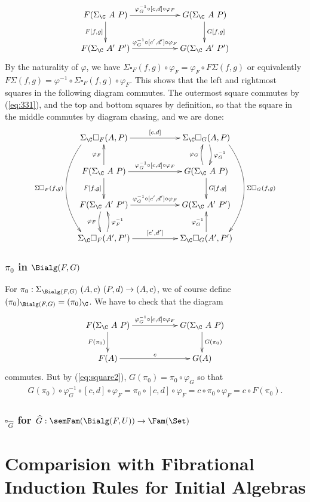 \documentclass{article}
\begin{document}
\[
\xymatrix{
F(\Sigma_{\C}\ A\ P) \ar^-{\varphi^{-1}_G \circ [c, d] \circ \varphi_F}[rr] \ar_-{F[f, g]}[d] & & G(\Sigma_{\C}\ A\ P) \ar^-{G[f,g]}[d] \\
F(\Sigma_{\C}\ A'\ P') \ar^-{\varphi^{-1}_G \circ [c', d'] \circ \varphi_F}[rr] & & G(\Sigma_{\C}\ A'\ P')
}
\]
By the naturality of $\varphi$, we have $\Sigma\square_F(f, g) \circ
\varphi_F = \varphi_F \circ F\Sigma(f, g)$ or equivalently $F\Sigma(f,
g) = \varphi^{-1} \circ \Sigma\square_F(f, g) \circ \varphi_F$. This
shows that the left and rightmost squares in the following diagram
commutes. The outermost square commutes by (\ref{eq:331}), and the top
and bottom squares by definition, so that the square in the middle
commutes by diagram chasing, and we are done:
\[
\xymatrix{
\Sigma_{\C}\square_F(A,P) \ar^-{[c, d]}[rr]  \ar_-{\Sigma\square_F(f, g)}@<-5ex>@/_2pc/[ddd] & & \Sigma_{\C}\square_G(A,P) \ar^-{\varphi^{-1}_G}@/^/[d] \ar^-{\Sigma\square_G(f, g)}@<5ex>@/^2pc/[ddd] \\
F(\Sigma_{\C}\ A\ P) \ar^-{\varphi_F}[u] \ar^-{\varphi^{-1}_G \circ [c, d] \circ \varphi_F}[rr] \ar_-{F[f, g]}[d] & & G(\Sigma_{\C}\ A\ P) \ar^-{G[f,g]}[d] \ar^-{\varphi_G}@/^/[u] \\
F(\Sigma_{\C}\ A'\ P') \ar_-{\varphi_F}@/_/[d] \ar^-{\varphi^{-1}_G \circ [c', d'] \circ \varphi_F}[rr] & & G(\Sigma_{\C}\ A'\ P') \\
\Sigma_{\C}\square_F(A',P') \ar_-{\varphi^{-1}_F}@/_/[u] \ar^-{[c', d']}[rr]  & & \Sigma_{\C}\square_G(A',P') \ar^-{\varphi^{-1}_G}[u] 
}
\]

\subsubsection{$\pi_0$ in $\Bialg(F, G)$}

For $\pi_0 : \Sigma_{\Bialg(F, G)}\ (A, c)\ (P, d) \to (A, c)$, we of course define $(\pi_0)_{\Bialg(F, G)} = (\pi_0)_{\C}$. We have to check that the diagram
\[
\xymatrix{
F(\Sigma_{\C}\ A\ P) \ar^-{\varphi^{-1}_G \circ [c, d] \circ \varphi_F}[rr] \ar_-{F(\pi_0)}[d] & & G(\Sigma_{\C}\ A\ P) \ar^-{G(\pi_0)}[d] \\
F(A) \ar^-{c}[rr] & & G(A)
}
\]
commutes. But by (\ref{eq:square2}), $G(\pi_0) = \pi_0 \circ \varphi_G$ so that
\begin{align*}
  G(\pi_0) \circ \varphi^{-1}_G \circ [c, d] \circ \varphi_F
  = \pi_0 \circ [c, d] \circ \varphi_F %
  = c \circ \pi_0  \circ \varphi_F %
  = c \circ F(\pi_0).
\end{align*}

\subsubsection{$\square_{\widehat{G}}$ for $\widehat{G} : \semFam(\Bialg(F, U)) \to \Fam(\Set)$}



\section{Comparision with Fibrational Induction Rules for Initial Algebras}
\end{document}
